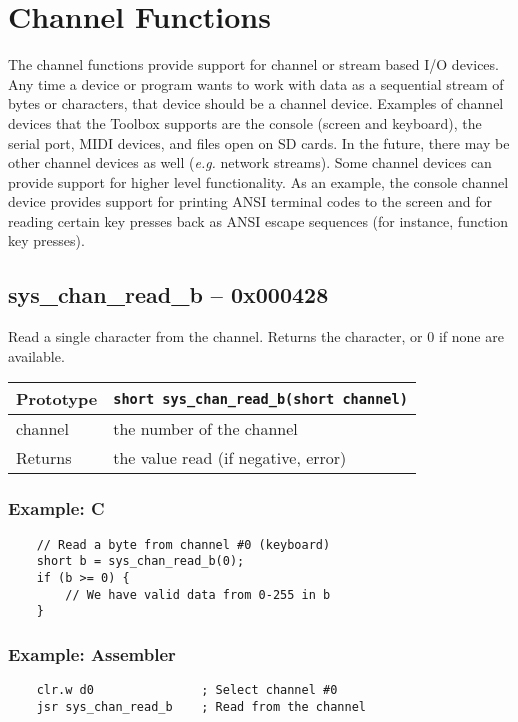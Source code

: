\section{Channel Functions}
The channel functions provide support for channel or stream based I/O devices.
Any time a device or program wants to work with data as a sequential stream of bytes or characters,
that device should be a channel device.
Examples of channel devices that the Toolbox supports are the console (screen and keyboard), the serial port,
MIDI devices, and files open on SD cards.
In the future, there may be other channel devices as well ({\it e.g.} network streams).
Some channel devices can provide support for higher level functionality.
As an example, the console channel device provides support for printing ANSI terminal codes to the screen
and for reading certain key presses back as ANSI escape sequences (for instance, function key presses).

\subsection*{sys\_chan\_read\_b -- 0x000428}
Read a single character from the channel. Returns the character, or 0 if none are available.

\bigskip

\begin{tabular}{|l||l|} \hline
Prototype & \lstinline!short sys_chan_read_b(short channel)! \\ \hline
channel & the number of the channel \\ \hline
Returns & the value read (if negative, error) \\ \hline
\end{tabular}

\subsubsection*{Example: C}
\begin{lstlisting}
    // Read a byte from channel #0 (keyboard)
    short b = sys_chan_read_b(0);
    if (b >= 0) {
        // We have valid data from 0-255 in b
    }
\end{lstlisting}

\subsubsection*{Example: Assembler}
\begin{verbatim}
    clr.w d0               ; Select channel #0
    jsr sys_chan_read_b    ; Read from the channel
\end{verbatim}

